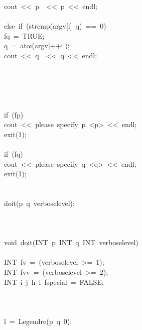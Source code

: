 \begin{tabbing}
\>\>\>cout\ <<\ p\ \ <<\ p\ <<\ endl;\\[0pt]
\>\>\>\\[0pt]
\>\>else\ if\ (strcmp(argv[i]\ q)\ ==\ 0)\ \\[0pt]
\>\>\>fq\ =\ TRUE;\\[0pt]
\>\>\>q\ =\ atoi(argv[++i]);\\[0pt]
\>\>\>cout\ <<\ q\ \ <<\ q\ <<\ endl;\\[0pt]
\>\>\>\\[0pt]
\>\>\\[0pt]
\>\\[0pt]
\\[0pt]
\\[0pt]
\>if\ (fp)\ \\[0pt]
\>\>cout\ <<\ please\ specify\ p\ <p>\ <<\ endl;\\[0pt]
\>\>exit(1);\\[0pt]
\>\>\\[0pt]
\>if\ (fq)\ \\[0pt]
\>\>cout\ <<\ please\ specify\ q\ <q>\ <<\ endl;\\[0pt]
\>\>exit(1);\\[0pt]
\>\>\\[0pt]
\\[0pt]
\>doit(p\ q\ verboselevel);\\[0pt]
\>\\[0pt]
\\[0pt]
\\[0pt]
void\ doit(INT\ p\ INT\ q\ INT\ verboselevel)\\[0pt]
\\[0pt]
\>INT\ fv\ =\ (verboselevel\ >=\ 1);\\[0pt]
\>INT\ fvv\ =\ (verboselevel\ >=\ 2);\\[0pt]
\>INT\ i\ j\ h\ l\ fspecial\ =\ FALSE;\\[0pt]
\\[0pt]
\\[0pt]
\\[0pt]
\>l\ =\ Legendre(p\ q\ 0);\\[0pt]

\end{tabbing}
